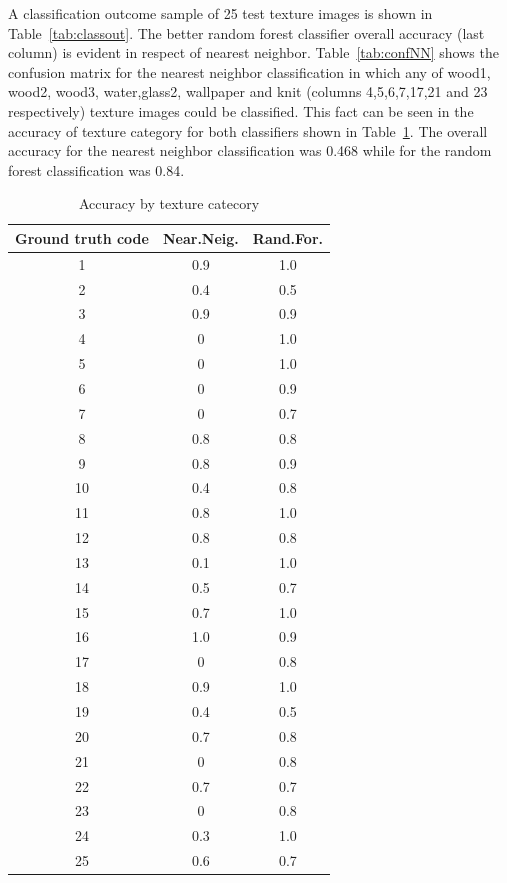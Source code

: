 \documentclass[10pt,twocolumn,letterpaper]{article}
\begin{document}
A classification outcome sample of 25 test texture images is shown in Table~\ref{tab:classout}. The better random forest classifier overall accuracy (last column) is evident in respect of nearest neighbor.  Table~\ref{tab:confNN} shows the confusion matrix for the nearest neighbor classification in which any of  wood1, wood2, wood3, water,glass2, wallpaper and knit (columns 4,5,6,7,17,21 and 23 respectively) texture images could be classified. This fact can be seen in the accuracy of texture category for both classifiers shown in Table~\ref{tab:texcatacc}. The overall accuracy for the nearest neighbor classification was 0.468 while for the random forest classification was 0.84.

\begin{table}
\begin{center}
\begin{tabular}{|c|c|c|}
\hline
Ground truth code & Near.Neig. & Rand.For. \\
\hline\hline
    1 & 0.9 & 1.0\\
    2 & 0.4 & 0.5\\
    3 & 0.9 & 0.9\\
    4 &   0 & 1.0\\
    5 &   0 & 1.0\\
    6 &   0 & 0.9\\
    7 &   0 & 0.7\\
    8 & 0.8 & 0.8\\
    9 & 0.8 & 0.9\\
   10 & 0.4 & 0.8\\
   11 & 0.8 & 1.0\\
   12 & 0.8 & 0.8\\
   13 & 0.1 & 1.0\\
   14 & 0.5 & 0.7\\
   15 & 0.7 & 1.0\\
   16 & 1.0 & 0.9\\
   17 &   0 & 0.8\\
   18 & 0.9 & 1.0\\
   19 & 0.4 & 0.5\\
   20 & 0.7 & 0.8\\
   21 &   0 & 0.8\\
   22 & 0.7 & 0.7\\
   23 &   0 & 0.8\\
   24 & 0.3 & 1.0\\
   25 & 0.6 & 0.7\\
\hline
\end{tabular}
\caption{Accuracy by texture catecory}
\label{tab:texcatacc}
\end{center}
\end{table}
\end{document}
